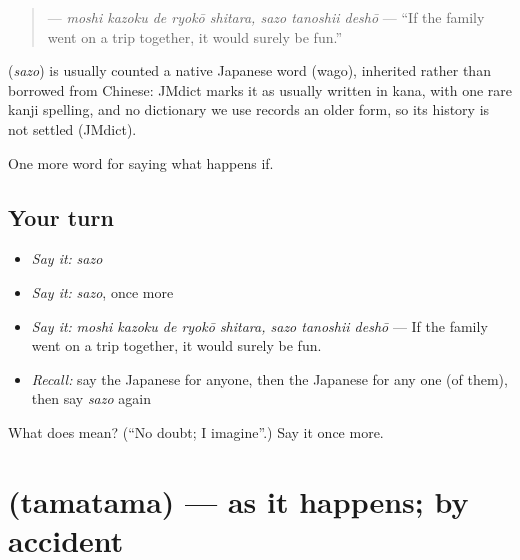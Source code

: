 \begin{quote}
\textbf{   } — \emph{moshi kazoku de ryokō shitara, sazo tanoshii deshō} — \textquotedblleft{}If the family went on a trip together, it would surely be fun.\textquotedblright{}
\end{quote}

\begin{cousinweb}
\textbf{} (\emph{sazo}) is usually counted a native Japanese word (wago), inherited rather than borrowed from Chinese: JMdict marks it as usually written in kana, with one rare kanji spelling, and no dictionary we use records an older form, so its history is not settled (JMdict).
\end{cousinweb}

\begin{grammarlens}[title={What you've built}]
One more word for saying what happens if.
\end{grammarlens}

\subsection*{Your turn}
\begin{itemize}
\raggedright
  \item \emph{Say it:} \emph{sazo}
  \item \emph{Say it:} \emph{sazo}, once more
  \item \emph{Say it:} \emph{moshi kazoku de ryokō shitara, sazo tanoshii deshō} — If the family went on a trip together, it would surely be fun.
  \item \emph{Recall:} say the Japanese for anyone, then the Japanese for any one (of them), then say \emph{sazo} again
\end{itemize}

\begin{tcolorbox}[breakable,colback=teal!4,colframe=teal!35!black,title={Before you move on}]
What does  mean? (\textquotedblleft{}No doubt; I imagine\textquotedblright{}.) Say it once more.
\end{tcolorbox}
\section[\texorpdfstring{\ja{たまたま} (tamatama)}{たまたま (tamatama)}]{ (tamatama) — as it happens; by accident}

\label{lesson:JA-C523-tamatama}




